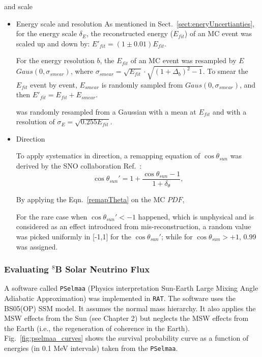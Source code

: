 and scale


\begin{itemize}
\item Energy scale and resolution
As mentioned in Sect.~\ref{sect:eneryUncertianties}, for the energy scale $\delta_E$, the reconstructed energy ($E_{fit}$) of an MC event was scaled up and down by: $E'_{fit} = (1\pm 0.01)E_{fit}$. 

For the energy resolution $b$, the $E_{fit}$ of an MC event was resampled by $E$
$Gaus(0,\sigma_{smear})$, where $\sigma_{smear}=\sqrt{E_{fit}}\cdot\sqrt{(1+\Delta_{b})^2-1}$. To smear the $E_{fit}$ event by event, $E_{smear}$ is randomly sampled from $Gaus(0,\sigma_{smear})$, and then $E'_{fit}=E_{fit}+E_{smear}$.

was randomly resampled from a Gaussian with a mean at $E_{fit}$ and with a resolution of $\sigma_E=\sqrt{0.255E_{fit}}$.

\item Direction

To apply systematics in direction, a remapping equation of $\cos\theta_{sun}$ was derived by the SNO collaboration Ref.~\cite{drouin2012three}:
\begin{equation}\label{remapThetaSun}
\cos\theta_{sun}'=1+\frac{\cos\theta_{sun}-1}{1+\delta_\theta},
\end{equation} 

By applying the Eqn.~\ref{remapTheta} on the MC $PDF$, 

For the rare case when $\cos\theta_{sun}'<-1$ happened, which is unphysical and is considered as an effect introduced from mis-reconstruction, a random value was picked uniformly in [-1,1] for the $\cos\theta_{sun}'$; while for $\cos\theta_{sun}>+1$, 0.99 was assigned.

%
\end{itemize}








\subsubsection{Evaluating $^8$B Solar Neutrino Flux}

A software called \texttt{PSelmaa} (Physics interpretation Sun-Earth Large Mixing Angle Adiabatic
Approximation) was implemented in \texttt{RAT}\cite{fady_pselmaa}. The software uses the BS05(OP) SSM model. It assumes the normal mass hierarchy. It also applies the MSW effects from the Sun (see Chapter 2) but neglects the MSW effects from the Earth (i.e., the regeneration of coherence in the Earth). Fig.~\ref{fig:pselmaa_curves} shows the survival probability curve as a function of energies (in 0.1 MeV intervals) taken from the \texttt{PSelmaa}.

